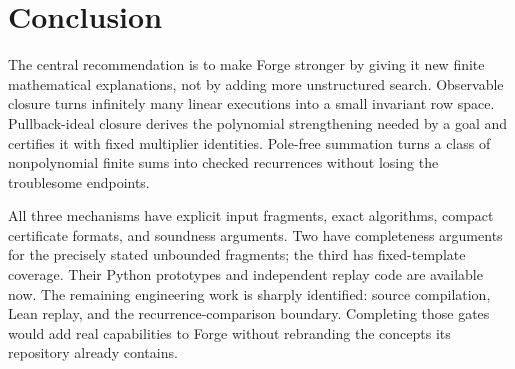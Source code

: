 \section{Conclusion}

The central recommendation is to make Forge stronger by giving it new finite
mathematical explanations, not by adding more unstructured search. Observable
closure turns infinitely many linear executions into a small invariant row
space. Pullback-ideal closure derives the polynomial strengthening needed by a
goal and certifies it with fixed multiplier identities. Pole-free summation
turns a class of nonpolynomial finite sums into checked recurrences without
losing the troublesome endpoints.

All three mechanisms have explicit input fragments, exact algorithms, compact
certificate formats, and soundness arguments. Two have completeness arguments
for the precisely stated unbounded fragments; the third has fixed-template
coverage. Their Python prototypes and independent replay code are available now.
The remaining engineering work is sharply identified: source compilation,
Lean replay, and the recurrence-comparison boundary. Completing those gates
would add real capabilities to Forge without rebranding the concepts its
repository already contains.
